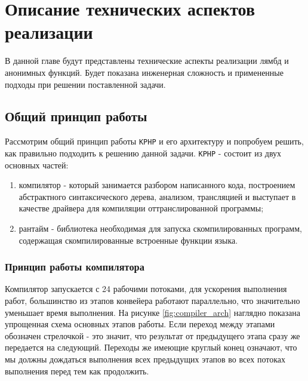 
\chapter{Описание технических аспектов реализации}
В данной главе будут представлены технические аспекты реализации лямбд и анонимных функций.
Будет показана инженерная сложность и примененные подходы при решении поставленной задачи.

\section{Общий принцип работы}
Рассмотрим общий принцип работы \verb|KPHP| и его архитектуру и попробуем решить, как правильно подходить к решению данной задачи.
\verb|KPHP| - состоит из двух основных частей:
\begin{enumerate}
\item компилятор - который занимается разбором написанного кода, построением абстрактного синтаксического дерева, анализом, трансляцией и выступает в качестве драйвера для компиляции оттранслированной программы;
\item рантайм - библиотека необходимая для запуска скомпилированных программ, содержащая скомпилированные встроенные функции языка.
\end{enumerate}

\subsection{Принцип работы компилятора}
Компилятор запускается с 24 рабочими потоками, для ускорения выполнения работ, большинство из этапов конвейера работают параллельно, что значительно уменьшает время выполнения.
На рисунке \ref{fig:compiler_arch} наглядно показана упрощенная схема основных этапов работы.
Если переход между этапами обозначен стрелочкой - это значит, что результат от предыдущего этапа сразу же передается на следующий.
Переходы же имеющие круглый конец означают, что мы должны дождаться выполнения всех предыдущих этапов во всех потоках выполнения перед тем как продолжить.

